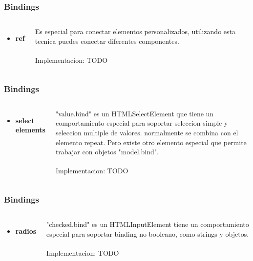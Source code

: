 \documentclass{beamer}
\begin{document}
\begin{frame}
\frametitle{Bindings}
\begin{columns}[c]

\begin{itemize}
\item \textbf{ref}
\end{itemize}
Es especial para conectar elementos personalizados, utilizando esta tecnica puedes conectar diferentes componentes.
\\~\\
Implementacion: TODO
\end{columns}
\end{frame}
\begin{frame}
\frametitle{Bindings}
\begin{columns}[c]

\begin{itemize}
\item \textbf{select elements}
\end{itemize}

"value.bind" es un HTMLSelectElement que tiene un comportamiento especial para soportar seleccion simple y seleccion multiple de valores. normalmente se combina con el elemento repeat. Pero existe otro elemento especial que permite trabajar con objetos "model.bind".
\\~\\
Implementacion: TODO
\end{columns}
\end{frame}
\begin{frame}
\frametitle{Bindings}
\begin{columns}[c]

\begin{itemize}
\item \textbf{radios}
\end{itemize}

"checked.bind" es un HTMLInputElement tiene un comportamiento especial para soportar binding no booleano, como strings y objetos.
\\~\\
Implementacion: TODO
\end{columns}
\end{frame}
\end{document}
